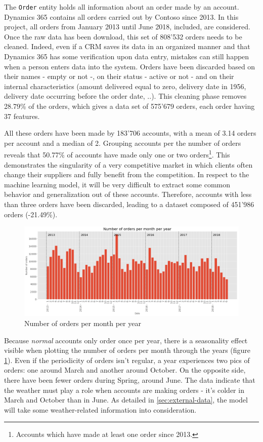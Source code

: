 The \texttt{Order} entity holds all information about an order made by an account. Dynamics 365 contains all orders carried out by Contoso since 2013. In this project, all orders from January 2013 until June 2018, included, are considered. Once the raw data has been download, this set of 808'532 orders needs to be cleaned. Indeed, even if a CRM saves its data in an organized manner and that Dynamics 365 has some verification upon data entry, mistakes can still happen when a person enters data into the system. Orders have been discarded based on their names - empty or not -, on their status - active or not - and on their internal characteristics (amount delivered equal to zero, delivery date in 1956, delivery date occurring before the order date, ..). This cleaning phase removes 28.79\% of the orders, which gives a data set of 575'679 orders, each order having 37 features.

All these orders have been made by 183'706 accounts, with a mean of 3.14 orders per account and a median of 2. Grouping accounts per the number of orders reveals that 50.77\% of accounts have made only one or two orders\footnote{Accounts which have made at least one order since 2013.}. This demonstrates the singularity of a very competitive market in which clients often change their suppliers and fully benefit from the competition. In respect to the machine learning model, it will be very difficult to extract some common behavior and generalization out of these accounts. Therefore, accounts with less than three orders have been discarded, leading to a dataset composed of 451'986 orders (-21.49\%).

\begin{figure}[h]
    \centering
    \includegraphics[width=15cm]{images/order_month_year.png}
    \caption{Number of orders per month per year}
    \label{fig:order_per_monthyear}
\end{figure}

Because \textit{normal} accounts only order once per year, there is a seasonality effect visible when plotting the number of orders per month through  the years (figure \ref{fig:order_per_monthyear}). Even if the periodicity of orders isn't regular, a year experiences two pics of orders: one around March and another around October. On the opposite side, there have been fewer orders during Spring, around June. The data indicate that the weather must play a role when accounts are making orders - it's colder in March and October than in June. As detailed in \ref{sec:external-data}, the model will take some weather-related information into consideration.

